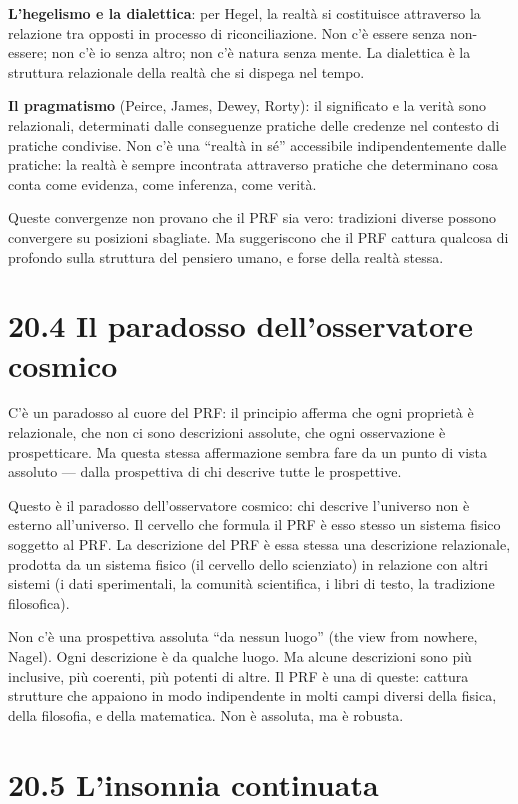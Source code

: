 \documentclass[11.5pt,a4paper,openany]{book}
\theoremstyle{remark}
\begin{document}
\textbf{L'hegelismo e la dialettica}: per Hegel, la realtà si costituisce attraverso la relazione tra opposti in processo di riconciliazione. Non c'è essere senza non-essere; non c'è io senza altro; non c'è natura senza mente. La dialettica è la struttura relazionale della realtà che si dispega nel tempo.

\textbf{Il pragmatismo} (Peirce, James, Dewey, Rorty): il significato e la verità sono relazionali, determinati dalle conseguenze pratiche delle credenze nel contesto di pratiche condivise. Non c'è una ``realtà in sé'' accessibile indipendentemente dalle pratiche: la realtà è sempre incontrata attraverso pratiche che determinano cosa conta come evidenza, come inferenza, come verità.

Queste convergenze non provano che il PRF sia vero: tradizioni diverse possono convergere su posizioni sbagliate. Ma suggeriscono che il PRF cattura qualcosa di profondo sulla struttura del pensiero umano, e forse della realtà stessa.

\section{20.4 Il paradosso dell'osservatore cosmico}

C'è un paradosso al cuore del PRF: il principio afferma che ogni proprietà è relazionale, che non ci sono descrizioni assolute, che ogni osservazione è prospetticare. Ma questa stessa affermazione sembra fare da un punto di vista assoluto --- dalla prospettiva di chi descrive tutte le prospettive.

Questo è il paradosso dell'osservatore cosmico: chi descrive l'universo non è esterno all'universo. Il cervello che formula il PRF è esso stesso un sistema fisico soggetto al PRF. La descrizione del PRF è essa stessa una descrizione relazionale, prodotta da un sistema fisico (il cervello dello scienziato) in relazione con altri sistemi (i dati sperimentali, la comunità scientifica, i libri di testo, la tradizione filosofica).

Non c'è una prospettiva assoluta ``da nessun luogo'' (the view from nowhere, Nagel). Ogni descrizione è da qualche luogo. Ma alcune descrizioni sono più inclusive, più coerenti, più potenti di altre. Il PRF è una di queste: cattura strutture che appaiono in modo indipendente in molti campi diversi della fisica, della filosofia, e della matematica. Non è assoluta, ma è robusta.

\section{20.5 L'insonnia continuata}
\end{document}
